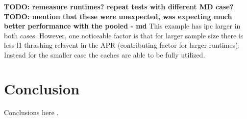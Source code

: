\documentclass[11pt, twocolumn]{proc}
\begin{document}
\begin{table}[h!]
    \centering
    \caption{pool - unpooled}
\end{table}

\begin{table}[h!]
    \centering
    \caption{pool - pooled}
\end{table}

\textbf{TODO: remeasure runtimes? repeat tests with different MD case?}
\textbf{TODO: mention that these were unexpected, was expecting much better performance with the pooled - md}
This example has ipc larger in both cases.    However, one noticeable factor is that for larger sample size there is less l1 thrashing relavent in the APR (contributing factor for larger runtimes).  Instead for the smaller case the caches are able to be fully utilized.


\section{Conclusion}
\label{sec:conclusion}

Conclusions here \cite{freebsd} \cite{unix}.


\onecolumn
\begin{sloppypar}


\end{sloppypar}

\end{document}
